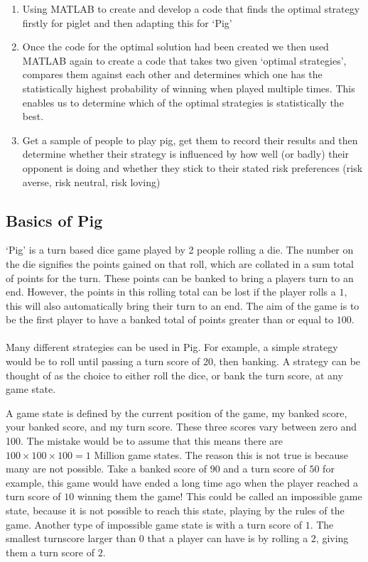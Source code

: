 \documentclass[a4paper,titlepage]{article}
\begin{document}
\begin{enumerate}
\item Using MATLAB to create and develop a code that finds the optimal strategy firstly for piglet and then adapting this for ‘Pig’

\item Once the code for the optimal solution had been created we then used MATLAB again to create a code that takes two given ‘optimal strategies’, compares them against each other and determines which one has the statistically highest probability of winning when played multiple times. This enables us to determine which of the optimal strategies is statistically the best. 

\item Get a sample of people to play pig, get them to record their results and then determine whether their strategy is influenced by how well (or badly) their opponent is doing and whether they stick to their stated risk preferences (risk averse, risk neutral, risk loving) 
\end{enumerate}

\subsection{Basics of Pig}
`Pig' is a turn based dice game played by 2 people rolling a die. The number on the die signifies the points gained on that roll,
which are collated in a sum total of points for the turn. These points can be banked to bring a players turn to an end.
However, the points in this rolling total can be lost if the player rolls a $1$, this will also automatically bring their turn to an end.
The aim of the game is to be the first player to have a banked total of points greater than or equal to $100$.
\\
\\
Many different strategies can be used in Pig. For example, a simple strategy would be to roll until passing a turn score of 20, then banking.
A strategy can be thought of as the choice to either roll the dice, or bank the turn score, at any game state.

A game state is defined by the current position of the game, my banked score, your banked score, and my turn score.
These three scores vary between zero and 100. The mistake would be to assume that this means there are $100\times100\times100 = 1$ Million
game states. The reason this is not true is because many are not possible. Take a banked score of $90$ and a turn score of $50$ for example,
this game would have ended a long time ago when the player reached a turn score of $10$ winning them the game! This could be called an impossible
game state, because it is not possible to reach this state, playing by the rules of the game. Another type of impossible game state is
with a turn score of $1$. The smallest turnscore larger than $0$ that a player can have is by rolling a $2$, giving them a turn score of $2$.
\end{document}
